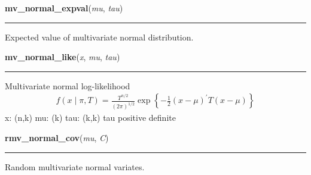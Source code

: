     \vspace{0.5ex}

    \begin{boxedminipage}{\textwidth}

    \raggedright \textbf{mv\_normal\_expval}(\textit{mu}, \textit{tau})

    \vspace{-1.5ex}

    \rule{\textwidth}{0.5\fboxrule}

Expected value of multivariate normal distribution.
    \vspace{1ex}

    \end{boxedminipage}

    \label{pymc:distributions:mv_normal_like}

    \vspace{0.5ex}

    \begin{boxedminipage}{\textwidth}

    \raggedright \textbf{mv\_normal\_like}(\textit{x}, \textit{mu}, \textit{tau})

    \vspace{-1.5ex}

    \rule{\textwidth}{0.5\fboxrule}

Multivariate normal log-likelihood
\begin{equation*}\begin{split}f(x \mid \pi, T) = \frac{T^{n/2}}{(2\pi)^{1/2}} \exp\left\{ -\frac{1}{2} (x-\mu)^{\prime}T(x-\mu) \right\}\end{split}\end{equation*}
x: (n,k)
mu: (k)
tau: (k,k)
tau positive definite
    \vspace{1ex}

    \end{boxedminipage}

    \label{pymc:distributions:rmv_normal_cov}

    \vspace{0.5ex}

    \begin{boxedminipage}{\textwidth}

    \raggedright \textbf{rmv\_normal\_cov}(\textit{mu}, \textit{C})

    \vspace{-1.5ex}

    \rule{\textwidth}{0.5\fboxrule}

Random multivariate normal variates.
    \vspace{1ex}

    \end{boxedminipage}

